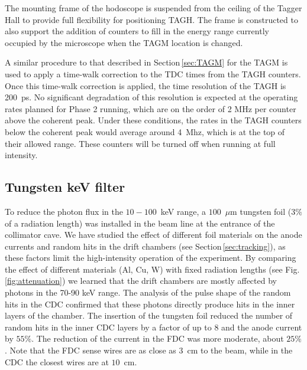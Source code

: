 The mounting frame of the hodoscope is suspended from the ceiling of the Tagger Hall
to provide full flexibility for positioning TAGH. The frame is constructed
to also support the addition of counters to fill in the energy range currently
occupied by the microscope when the TAGM location is changed.

A similar procedure to that described in Section\,\ref{sec:TAGM} for the TAGM is used to apply
a time-walk correction to the TDC times from the TAGH counters. Once this
time-walk correction
is applied, the time resolution of the TAGH is 200~ps. No significant
degradation of this resolution is expected at the operating rates planned
for Phase 2 running, which are on the order of 2 MHz per counter above
the coherent peak. Under these conditions, the rates in the TAGH counters
below the coherent peak would average around 4~Mhz, which is at the top
of their allowed range. These counters will be turned off when
running at full intensity.

\subsection{Tungsten keV filter}

To reduce the photon flux in the $10-100$~keV range, a $100$~$\mu$m tungsten foil ($3\%$ of a radiation length) was installed in the beam line at the entrance of the collimator cave.  We have studied the effect of different foil materials on the anode currents and  random hits in the drift chambers (see Section\,\ref{sec:tracking}), as these factors limit the high-intensity operation of the experiment. By comparing the effect of different materials (Al, Cu, W) with fixed radiation lengths (see Fig.\ref{fig:attenuation})  we learned that the drift chambers are mostly affected by photons in the 70-90 keV range. The analysis of the pulse shape  of the random hits in the CDC confirmed that these photons directly produce hits in the inner layers of the chamber. The insertion of the tungsten foil reduced the number of random hits in the inner CDC layers by a factor of up to 8 and the anode current by $55\%$. The reduction of the current in the FDC was more moderate, about $25\%$. Note that the FDC sense wires are as close as $3$~cm to the beam, while in the CDC the closest wires are at $10$~cm.

